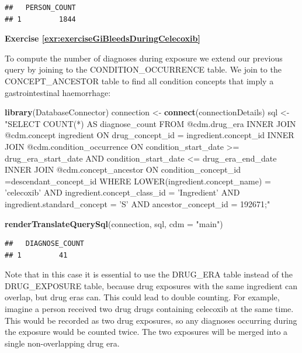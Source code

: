 \documentclass[11pt]{book}
\newenvironment{Shaded}{\begin{snugshade}}{\end{snugshade}}
\newcommand{\DataTypeTok}[1]{\textcolor[rgb]{0.13,0.29,0.53}{#1}}
\newcommand{\KeywordTok}[1]{\textcolor[rgb]{0.13,0.29,0.53}{\textbf{#1}}}
\newcommand{\NormalTok}[1]{#1}
\newcommand{\StringTok}[1]{\textcolor[rgb]{0.31,0.60,0.02}{#1}}
\theoremstyle{definition}
\theoremstyle{definition}
\theoremstyle{definition}
\theoremstyle{remark}
\begin{document}
\begin{verbatim}
##   PERSON_COUNT
## 1         1844
\end{verbatim}

\textbf{Exercise \ref{exr:exerciseGiBleedsDuringCelecoxib}}

To compute the number of diagnoses during exposure we extend our previous query by joining to the CONDITION\_OCCURRENCE table. We join to the CONCEPT\_ANCESTOR table to find all condition concepts that imply a gastrointestinal haemorrhage:

\begin{Shaded}
\begin{Highlighting}[]
\KeywordTok{library}\NormalTok{(DatabaseConnector)}
\NormalTok{connection <-}\StringTok{ }\KeywordTok{connect}\NormalTok{(connectionDetails)}
\NormalTok{sql <-}\StringTok{ "SELECT COUNT(*) AS diagnose_count}
\StringTok{FROM @cdm.drug_era}
\StringTok{INNER JOIN @cdm.concept ingredient}
\StringTok{  ON drug_concept_id = ingredient.concept_id}
\StringTok{INNER JOIN @cdm.condition_occurrence}
\StringTok{  ON condition_start_date >= drug_era_start_date}
\StringTok{    AND condition_start_date <= drug_era_end_date}
\StringTok{INNER JOIN @cdm.concept_ancestor }
\StringTok{  ON condition_concept_id =descendant_concept_id}
\StringTok{WHERE LOWER(ingredient.concept_name) = 'celecoxib'}
\StringTok{  AND ingredient.concept_class_id = 'Ingredient'}
\StringTok{  AND ingredient.standard_concept = 'S'}
\StringTok{  AND ancestor_concept_id = 192671;"}

\KeywordTok{renderTranslateQuerySql}\NormalTok{(connection, sql, }\DataTypeTok{cdm =} \StringTok{"main"}\NormalTok{)}
\end{Highlighting}
\end{Shaded}

\begin{verbatim}
##   DIAGNOSE_COUNT
## 1         41
\end{verbatim}

Note that in this case it is essential to use the DRUG\_ERA table instead of the DRUG\_EXPOSURE table, because drug exposures with the same ingredient can overlap, but drug eras can. This could lead to double counting. For example, imagine a person received two drug drugs containing celecoxib at the same time. This would be recorded as two drug exposures, so any diagnoses occurring during the exposure would be counted twice. The two exposures will be merged into a single non-overlapping drug era.



\backmatter
\printindex
\end{document}
